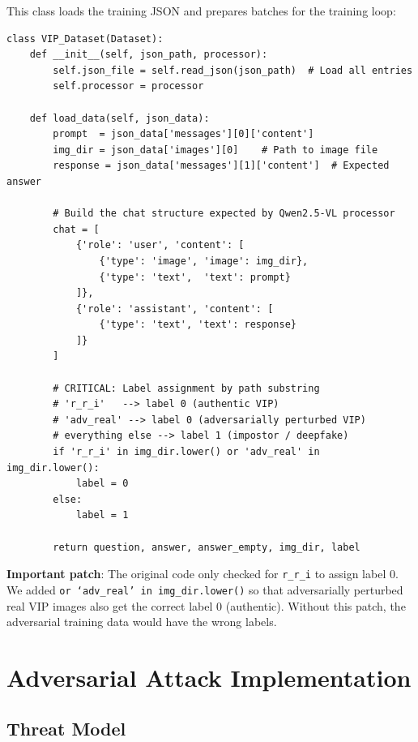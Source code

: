 \documentclass[12pt,a4paper]{article}
\begin{document}
This class loads the training JSON and prepares batches for the training loop:

\begin{lstlisting}[caption={VIP\_Dataset.py -- Key methods}]
class VIP_Dataset(Dataset):
    def __init__(self, json_path, processor):
        self.json_file = self.read_json(json_path)  # Load all entries
        self.processor = processor

    def load_data(self, json_data):
        prompt  = json_data['messages'][0]['content']
        img_dir = json_data['images'][0]    # Path to image file
        response = json_data['messages'][1]['content']  # Expected answer

        # Build the chat structure expected by Qwen2.5-VL processor
        chat = [
            {'role': 'user', 'content': [
                {'type': 'image', 'image': img_dir},
                {'type': 'text',  'text': prompt}
            ]},
            {'role': 'assistant', 'content': [
                {'type': 'text', 'text': response}
            ]}
        ]

        # CRITICAL: Label assignment by path substring
        # 'r_r_i'   --> label 0 (authentic VIP)
        # 'adv_real' --> label 0 (adversarially perturbed VIP)
        # everything else --> label 1 (impostor / deepfake)
        if 'r_r_i' in img_dir.lower() or 'adv_real' in img_dir.lower():
            label = 0
        else:
            label = 1

        return question, answer, answer_empty, img_dir, label
\end{lstlisting}

\begin{warnbox}
\textbf{Important patch}: The original code only checked for \texttt{r\_r\_i} to assign label 0. We added \texttt{or `adv\_real' in img\_dir.lower()} so that adversarially perturbed real VIP images also get the correct label 0 (authentic). Without this patch, the adversarial training data would have the wrong labels.
\end{warnbox}

\section{Adversarial Attack Implementation}

\subsection{Threat Model}
\end{document}
